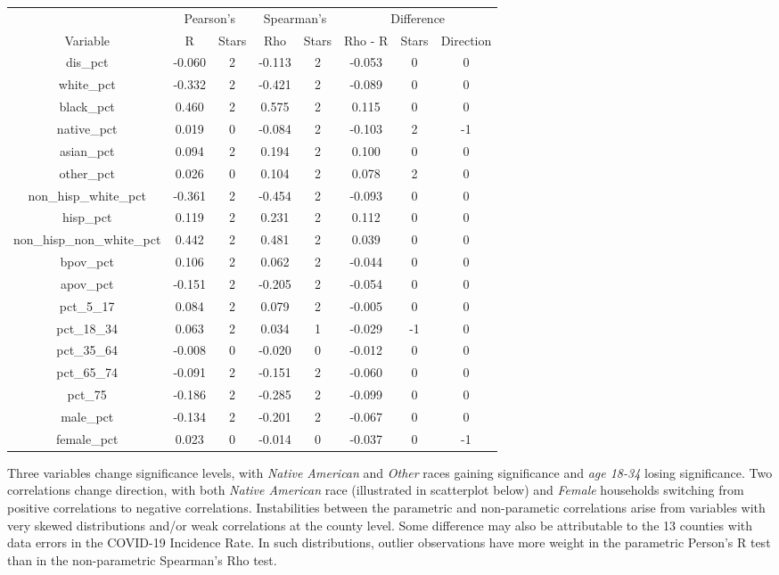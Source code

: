 \documentclass[
]{article}
\begin{document}
\begin{table}
\centering
\begin{tabular}{c|c|c|c|c|c|c|c}
\hline
\multicolumn{1}{c|}{ } & \multicolumn{2}{c|}{Pearson's} & \multicolumn{2}{c|}{Spearman's} & \multicolumn{3}{c}{Difference} \\
\cline{2-3} \cline{4-5} \cline{6-8}
Variable & R & Stars & Rho & Stars & Rho - R & Stars & Direction\\
\hline
dis\_pct & -0.060 & 2 & -0.113 & 2 & -0.053 & 0 & 0\\
\hline
white\_pct & -0.332 & 2 & -0.421 & 2 & -0.089 & 0 & 0\\
\hline
black\_pct & 0.460 & 2 & 0.575 & 2 & 0.115 & 0 & 0\\
\hline
native\_pct & 0.019 & 0 & -0.084 & 2 & -0.103 & 2 & -1\\
\hline
asian\_pct & 0.094 & 2 & 0.194 & 2 & 0.100 & 0 & 0\\
\hline
other\_pct & 0.026 & 0 & 0.104 & 2 & 0.078 & 2 & 0\\
\hline
non\_hisp\_white\_pct & -0.361 & 2 & -0.454 & 2 & -0.093 & 0 & 0\\
\hline
hisp\_pct & 0.119 & 2 & 0.231 & 2 & 0.112 & 0 & 0\\
\hline
non\_hisp\_non\_white\_pct & 0.442 & 2 & 0.481 & 2 & 0.039 & 0 & 0\\
\hline
bpov\_pct & 0.106 & 2 & 0.062 & 2 & -0.044 & 0 & 0\\
\hline
apov\_pct & -0.151 & 2 & -0.205 & 2 & -0.054 & 0 & 0\\
\hline
pct\_5\_17 & 0.084 & 2 & 0.079 & 2 & -0.005 & 0 & 0\\
\hline
pct\_18\_34 & 0.063 & 2 & 0.034 & 1 & -0.029 & -1 & 0\\
\hline
pct\_35\_64 & -0.008 & 0 & -0.020 & 0 & -0.012 & 0 & 0\\
\hline
pct\_65\_74 & -0.091 & 2 & -0.151 & 2 & -0.060 & 0 & 0\\
\hline
pct\_75 & -0.186 & 2 & -0.285 & 2 & -0.099 & 0 & 0\\
\hline
male\_pct & -0.134 & 2 & -0.201 & 2 & -0.067 & 0 & 0\\
\hline
female\_pct & 0.023 & 0 & -0.014 & 0 & -0.037 & 0 & -1\\
\hline
\end{tabular}
\end{table}

Three variables change significance levels, with \emph{Native American}
and \emph{Other} races gaining significance and \emph{age 18-34} losing
significance. Two correlations change direction, with both \emph{Native
American} race (illustrated in scatterplot below) and \emph{Female}
households switching from positive correlations to negative
correlations. Instabilities between the parametric and non-parametic
correlations arise from variables with very skewed distributions and/or
weak correlations at the county level. Some difference may also be
attributable to the 13 counties with data errors in the COVID-19
Incidence Rate. In such distributions, outlier observations have more
weight in the parametric Person's R test than in the non-parametric
Spearman's Rho test.
\end{document}
